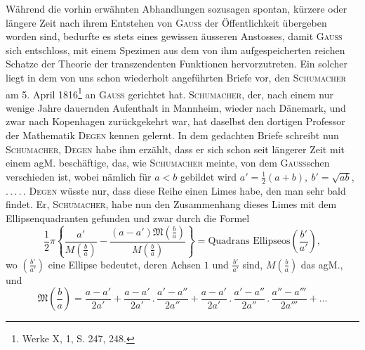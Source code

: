 \clearpage{}
\begin{center}\end{center}
\noindent\hspace*{\parindent}Während die vorhin erwähnten Abhandlungen sozusagen spontan, kürzere
oder längere Zeit nach ihrem Entstehen von \textsc{Gauss} der Öffentlichkeit übergeben
worden sind, bedurfte es stets eines gewissen äusseren Anstosses, damit
\textsc{Gauss} sich entschloss, mit einem Spezimen aus dem von ihm aufgespeicherten
reichen Schatze der Theorie der transzendenten Funktionen hervorzutreten.
Ein solcher liegt in dem von uns schon wiederholt angeführten Briefe vor,
den \textsc{Schumacher} am 5. April 1816\footnote{Werke X, 1, S. 247, 248.} an \textsc{Gauss} gerichtet hat. \textsc{Schumacher},
der, nach einem nur wenige Jahre dauernden Aufenthalt in Mannheim, wieder
nach Dänemark, und zwar nach Kopenhagen zurückgekehrt war, hat daselbst
den dortigen Professor der Mathematik \textsc{Degen} kennen gelernt. In dem gedachten
Briefe schreibt nun \textsc{Schumacher}, \textsc{Degen} habe ihm erzählt, dass er sich
schon seit längerer Zeit mit einem agM. beschäftige, das, wie \textsc{Schumacher}
meinte, von dem \textsc{Gauss}schen verschieden ist, wobei nämlich für \(a<b\) gebildet
wird \(a'=\frac12(a+b),\ b'=\sqrt{ab}\), \mbox{.\,.\,.\,.\,.} \textsc{Degen} wüsste nur, dass diese Reihe einen
Limes habe, den man sehr bald findet. Er, \textsc{Schumacher}, habe nun den Zusammenhang
dieses Limes mit dem Ellipsenquadranten gefunden und zwar
durch die Formel
\begingroup\makeatletter\tagsleft@true\let\veqno\leqno\makeatother
\begin{equation*}
\frac12\pi\left\{\frac{a'}{M\left(\frac ba\right)}-
\frac{(a-a')\mathfrak{M}\left(\frac ba\right)}{M\left(\frac ba\right)}\right\}
=\text{Quadrans Ellipseos}\left(\frac{b'}{a'}\right),\tag{7}
\end{equation*}
\endgroup
\noindent wo \(\left(\frac{b'}{a'}\right)\) eine Ellipse bedeutet, deren Achsen \(1\) und \(\frac{b'}{a'}\) sind, \(M\left(\frac ba\right)\) das agM.,
und
\begingroup\makeatletter\tagsleft@true\let\veqno\leqno\makeatother
\begin{equation*}
\mathfrak{M}\left(\frac ba\right)=\frac{a-a'}{2a'}+
\frac{a-a'}{2a'}\mathbin{.}\frac{a'-a''}{2a''}+
\frac{a-a'}{2a'}\mathbin{.}\frac{a'-a''}{2a''}\mathbin{.}\frac{a''-a'''}{2a'''}+\ldots\tag{8}
\end{equation*}
